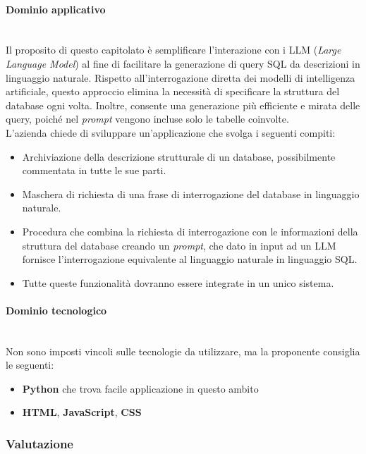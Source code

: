 \documentclass[italian,12pt]{article} %
\begin{document}
\paragraph{Dominio applicativo}\mbox{}\\
Il proposito di questo capitolato è semplificare l'interazione con i LLM (\textit{Large Language Model}) al fine di facilitare la generazione di query SQL da descrizioni in
linguaggio naturale. Rispetto all'interrogazione diretta dei modelli di intelligenza artificiale, questo approccio elimina la necessità di specificare la struttura
del database ogni volta. Inoltre, consente una generazione più efficiente e mirata delle query, poiché nel \textit{prompt} vengono incluse solo le tabelle coinvolte.
\\\linebreak\pagebreak\linebreak
L'azienda chiede di sviluppare un'applicazione che svolga i seguenti compiti:
\begin{itemize}
	\item Archiviazione della descrizione strutturale di un database, possibilmente commentata in tutte le sue parti.
	\item Maschera di richiesta di una frase di interrogazione del database in linguaggio naturale.
	\item Procedura che combina la richiesta di interrogazione con le informazioni della struttura del database creando un \textit{prompt}, che
	      dato in input ad un LLM fornisce l’interrogazione equivalente al linguaggio naturale in linguaggio SQL.
	\item Tutte queste funzionalità dovranno essere integrate in un unico sistema.
\end{itemize}
\paragraph{Dominio tecnologico}\mbox{}\\
Non sono imposti vincoli sulle tecnologie da utilizzare, ma la proponente consiglia le seguenti:
\begin{itemize}
	\item \textbf{Python} che trova facile applicazione in questo ambito
	\item \textbf{HTML}, \textbf{JavaScript}, \textbf{CSS}
\end{itemize}

\subsubsection{Valutazione}
\end{document}
